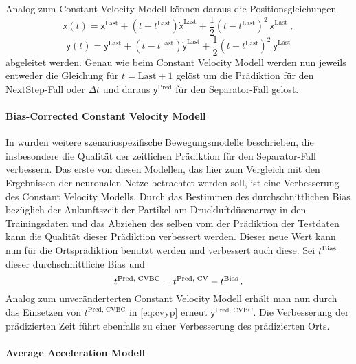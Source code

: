 Analog zum Constant Velocity Modell können daraus die Positionsgleichungen 
% 
\begin{equation*}
    \mathsf{x}(t) = \mathsf{x}^{\text{Last}} + (t - t^{\text{Last}})\dot{\mathsf{x}}^{\text{Last}} 
    + \frac{1}{2} (t - t^{\text{Last}})^2 \: \ddot{\mathsf{x}}^{\text{Last}} \: , 
\end{equation*}
\begin{equation*}
    \mathsf{y}(t) = \mathsf{y}^{\text{Last}} + (t - t^{\text{Last}})\dot{\mathsf{y}}^{\text{Last}}
    + \frac{1}{2} (t - t^{\text{Last}})^2 \: \ddot{\mathsf{y}}^{\text{Last}}
\end{equation*}
% 
abgeleitet werden.
Genau wie beim Constant Velocity Modell werden nun jeweils entweder die Gleichung für \(t = \text{Last} + 1\) gelöst 
um die Prädiktion für den NextStep-Fall oder \(\Delta t \) und daraus \(\mathsf{y}^{\text{Pred}}\) für den Separator-Fall gelöst.


\paragraph{Bias-Corrected Constant Velocity Modell}

In \cite{Pfaff2018} wurden weitere szenariospezifische Bewegungsmodelle beschrieben, die insbesondere die Qualität der zeitlichen Prädiktion für den Separator-Fall verbessern.
Das erste von diesen Modellen, das hier zum Vergleich mit den Ergebnissen der neuronalen Netze betrachtet werden soll, ist eine Verbesserung des Constant Velocity Modells.
Durch das Bestimmen des durchschnittlichen Bias bezüglich der Ankunftszeit der Partikel am Druckluftdüsenarray in den Trainingsdaten und das Abziehen des selben vom der Prädiktion der Testdaten kann die Qualität dieser Prädiktion verbessert werden.
Dieser neue Wert kann nun für die Ortsprädiktion benutzt werden und verbessert auch diese.
Sei \(t{^{\text{Bias}}}\) dieser durchschnittliche Bias und
% 
\begin{equation*}
    t{^{\text{Pred, CVBC}}} = t{^{\text{Pred, CV}}} - t{^{\text{Bias}}} \, .
\end{equation*}
% 
Analog zum unveränderterten Constant Velocity Modell erhält man nun durch das Einsetzen von \(t^{\text{Pred, CVBC}}\) in \eqref{eq:cvyp} erneut \(\mathsf{y}^{\text{Pred, CVBC}}\).
Die Verbesserung der prädizierten Zeit führt ebenfalls zu einer Verbesserung des prädizierten Orts.


\paragraph{Average Acceleration Modell}

